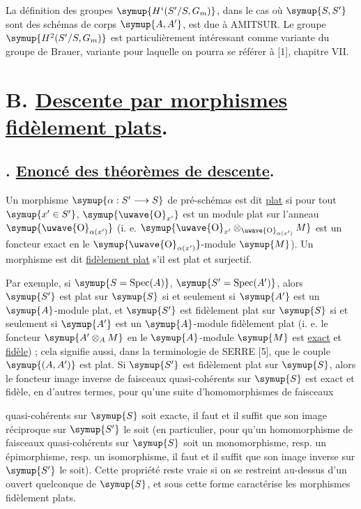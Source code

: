  La définition des groupes $\symup{H^i(S'/S,G_m)}$, dans le cas où
$\symup{S,S'}$ sont des schémas de corps $\symup{A,A'}$, est due à AMITSUR. Le groupe
$\symup{H^2(S'/S,G_m)}$ est particulièrement intéressant comme variante 
du groupe de Brauer, variante pour laquelle on pourra se référer à [1],
chapitre VII.

\section*{\normalfont B. \uline{Descente par morphismes fidèlement plats}.}

\subsection*{. \uline{Enoncé des théorèmes de descente}.}

 Un morphisme
$\symup{\alpha:S'\longrightarrow S}$ de pré-schémas est dit \uline{plat} si pour tout
$\symup{x'\in S'}$, $\symup{\text{\uwave{O}}_{x'}}$ est un module plat sur l'anneau
$\symup{\text{\uwave{O}}_{\alpha(x')}}$ (i. e.
$\symup{\text{\uwave{O}}_{x'}\otimes_{\text{\uwave{O}}_{\alpha(x')}}M}$ est un foncteur exact en
le $\symup{\text{\uwave{O}}_{\alpha(x')}}$-module $\symup{M}$). Un morphisme est dit
\uline{fidèlement plat} s'il est plat et surjectif.

Par exemple, si $\symup{S=\operatorname{Spec}(A)}$,
$\symup{S'=\operatorname{Spec}(A')}$, alors $\symup{S'}$ est plat sur $\symup{S}$ si et seulement si
$\symup{A'}$ est un $\symup{A}$-module plat, et $\symup{S'}$ est fidèlement plat sur $\symup{S}$ si et
seulement si $\symup{A'}$ est un $\symup{A}$-module fidèlement plat (i. e. le foncteur
$\symup{A'\otimes_A M}$ en le $\symup{A}$-module $\symup{M}$ est \uline{exact} et \uline{fidèle}) ; cela signifie
aussi, dans la terminologie de SERRE [5], que le couple $\symup{(A,A')}$ est plat. Si
$\symup{S'}$ est fidèlement plat sur $\symup{S}$, alors le foncteur image inverse de faisceaux
quasi-cohérents sur $\symup{S}$ est exact et fidèle, en d'autres termes, pour qu'une
suite d'homomorphismes de faisceaux

quasi-cohérents sur $\symup{S}$ soit exacte, il faut et il suffit que son image
réciproque sur $\symup{S'}$ le soit (en particulier, pour qu'un homomorphisme de
faisceaux quasi-cohérents sur $\symup{S}$ soit un monomorphisme, resp. un
épimorphisme, resp. un isomorphisme, il faut et il suffit que son image inverse
sur $\symup{S'}$ le soit). Cette propriété reste vraie si on se restreint au-dessus
d'un ouvert quelconque de $\symup{S}$, et sous cette forme caractérise les morphismes
fidèlement plats.

